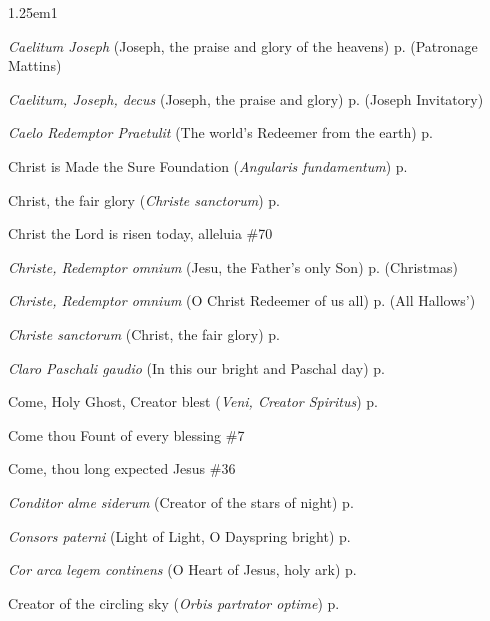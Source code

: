 \begin{hangparas}{1.25em}{1}
\par\noindent
\textit{Caelitum Joseph} (Joseph, the praise and glory of the heavens) \dotfill p. \pageref{PatronageMattins} (Patronage Mattins)
\par\noindent
\textit{Caelitum, Joseph, decus} (Joseph, the praise and glory) \dotfill p. \pageref{JosephInvitatory} (Joseph Invitatory)
\par\noindent
\textit{Caelo Redemptor Praetulit} (The world's Redeemer from the earth) \dotfill p. \pageref{MotherhoodInvitatory}
\par\noindent
Christ is Made the Sure Foundation (\textit{Angularis fundamentum}) \dotfill p. \pageref{DedicationMattins}
\par\noindent
Christ, the fair glory (\textit{Christe sanctorum}) \dotfill p. \pageref{MichaelMattins}
\par\noindent
Christ the Lord is risen today, alleluia \dotfill \#70
\par\noindent
\textit{Christe, Redemptor omnium} (Jesu, the Father's only Son) \dotfill p. \pageref{ChristmasEvensong} (Christmas)
\par\noindent
\textit{Christe, Redemptor omnium} (O Christ Redeemer of us all) \dotfill p. \pageref{AllHallowsEvensong} (All Hallows')
\par\noindent
\textit{Christe sanctorum} (Christ, the fair glory) \dotfill p. \pageref{MichaelMattins}
\par\noindent
\textit{Claro Paschali gaudio} (In this our bright and Paschal day) \dotfill p. \pageref{ApostlesMattinsEaster}
\par\noindent
Come, Holy Ghost, Creator blest (\textit{Veni, Creator Spiritus}) \dotfill p. \pageref{WhitsundayEvensongHymn}
\par\noindent
Come thou Fount of every blessing \dotfill \#7
\par\noindent
Come, thou long expected Jesus \dotfill \#36
\par\noindent
\textit{Conditor alme siderum} (Creator of the stars of night) \dotfill p. \pageref{FirstAdventEvensong}
\par\noindent
\textit{Consors paterni} (Light of Light, O Dayspring bright) \dotfill p. \pageref{TuesdayInvitatory}
\par\noindent
\textit{Cor arca legem continens} (O Heart of Jesus, holy ark) \dotfill p. \pageref{CompassionMattins}
\par\noindent
Creator of the circling sky (\textit{Orbis partrator optime}) \dotfill p. \pageref{GuardianAngelsMattins}
\par\noindent

\end{hangparas}
